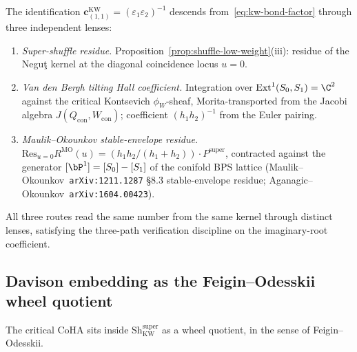 \begin{remark}
\label{rem:c11-three-ways}
The identification $\mathbf{c}^{\mathrm{KW}}_{(1,1)} = (\varepsilon_1 \varepsilon_2)^{-1}$ descends from~\eqref{eq:kw-bond-factor} through three independent lenses:
\begin{enumerate}[label=\textup{(\alph*)}]
 \item \emph{Super-shuffle residue.} Proposition~\ref{prop:shuffle-low-weight}\textup{(iii)}: residue of the Negu\c{t} kernel at the diagonal coincidence locus $u = 0$.
 \item \emph{Van den Bergh tilting Hall coefficient.} Integration over $\mathrm{Ext}^1(S_0, S_1) = \C^2$ against the critical Kontsevich $\phi_W$-sheaf, Morita-transported from the Jacobi algebra $J(Q_{\mathrm{con}}, W_{\mathrm{con}})$; coefficient $(h_1 h_2)^{-1}$ from the Euler pairing.
 \item \emph{Maulik--Okounkov stable-envelope residue.} $\mathrm{Res}_{u = 0} R^{\mathrm{MO}}(u) = (h_1 h_2 / (h_1 + h_2)) \cdot P^{\mathrm{super}}$, contracted against the generator $[\bP^1] = [S_0] - [S_1]$ of the conifold BPS lattice (Maulik--Okounkov~\texttt{arXiv:1211.1287} \S8.3 stable-envelope residue; Aganagic--Okounkov~\texttt{arXiv:1604.00423}).
\end{enumerate}
All three routes read the same number from the same kernel through distinct lenses, satisfying the three-path verification discipline on the imaginary-root coefficient.
\end{remark}

\subsection{Davison embedding as the Feigin--Odesskii wheel quotient}
\label{subsec:davison-wheel}

The critical CoHA sits inside $\mathrm{Sh}^{\mathrm{super}}_{\mathrm{KW}}$ as a wheel quotient, in the sense of Feigin--Odesskii.

